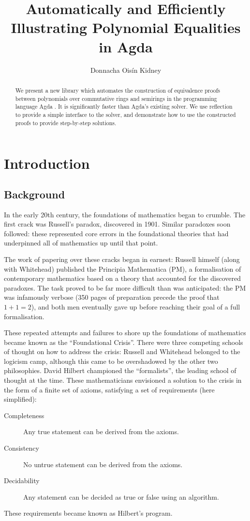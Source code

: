 \documentclass[12pt]{article}
\begin{document}
\title{Automatically and Efficiently Illustrating Polynomial Equalities in Agda}
\author{Donnacha Ois\'in Kidney}

\maketitle
\begin{abstract}
  We present a new library which automates the construction of equivalence
  proofs between polynomials over commutative rings and semirings in the
  programming language Agda \cite{norell_dependently_2008}. It is significantly
  faster than Agda's existing solver. We use reflection to provide a simple
  interface to the solver, and demonstrate how to use the constructed proofs to
  provide step-by-step solutions.
\end{abstract}
\tableofcontents

\section{Introduction}
\subsection{Background}
In the early 20th century, the foundations of mathematics began to crumble.
The first crack was Russell's paradox, discovered in 1901.
Similar paradoxes soon followed: these represented core errors in the
foundational theories that had underpinned all of mathematics up until that
point.

The work of papering over these cracks began in earnest:
Russell himself (along with Whitehead) published the Principia Mathematica (PM), a
formalisation of contemporary mathematics based on a theory that accounted for
the discovered paradoxes.
The task proved to be far more difficult than was anticipated: the PM was
infamously verbose (350 pages of preparation precede the proof that \(1+1=2\)),
and both men eventually gave up before reaching their goal of a full
formalisation.

These repeated attempts and failures to shore up the foundations of mathematics
became known as the ``Foundational Crisis''.
There were three competing schools of thought on how to address the crisis:
Russell and Whitehead belonged to the logicism camp, although this came to be
overshadowed by the other two philosophies.
David Hilbert championed the ``formalists'', the leading school of thought at
the time.
These mathematicians envisioned a solution to the crisis in the form of a
finite set of axioms, satisfying a set of requirements (here simplified):
\begin{description}
  \item[Completeness] Any true statement can be derived from the axioms.
  \item[Consistency] No untrue statement can be derived from the axioms.
  \item[Decidability] Any statement can be decided as true or false using an
    algorithm.
\end{description}
These requirements became known as Hilbert's program.
\end{document}
